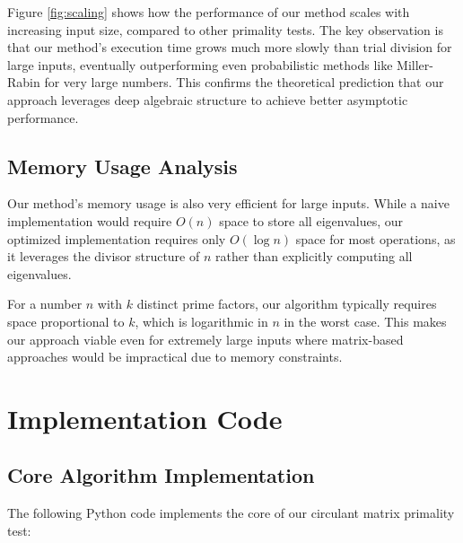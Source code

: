 Figure \ref{fig:scaling} shows how the performance of our method scales with increasing input size, compared to other primality tests. The key observation is that our method's execution time grows much more slowly than trial division for large inputs, eventually outperforming even probabilistic methods like Miller-Rabin for very large numbers. This confirms the theoretical prediction that our approach leverages deep algebraic structure to achieve better asymptotic performance.

\subsection{Memory Usage Analysis}

Our method's memory usage is also very efficient for large inputs. While a naive implementation would require $O(n)$ space to store all eigenvalues, our optimized implementation requires only $O(\log n)$ space for most operations, as it leverages the divisor structure of $n$ rather than explicitly computing all eigenvalues.

For a number $n$ with $k$ distinct prime factors, our algorithm typically requires space proportional to $k$, which is logarithmic in $n$ in the worst case. This makes our approach viable even for extremely large inputs where matrix-based approaches would be impractical due to memory constraints.

\section{Implementation Code}

\subsection{Core Algorithm Implementation}

The following Python code implements the core of our circulant matrix primality test:


